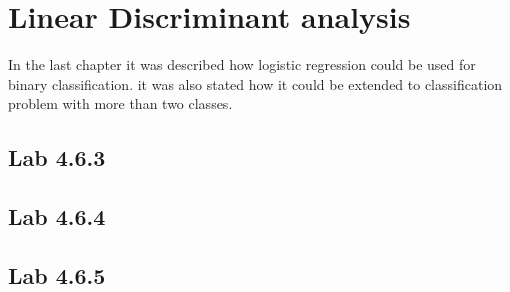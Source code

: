 \chapter{Linear Discriminant analysis}
\label{chp:lindisana}

In the last chapter it was described how logistic regression could be used for binary classification. it was also stated how it could be extended to  classification problem with more than two classes. 

\section{Lab 4.6.3}
\section{Lab 4.6.4}
\section{Lab 4.6.5}